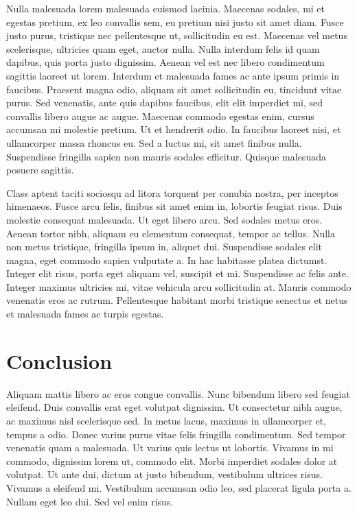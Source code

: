 \documentclass[12pt]{article}
\begin{document}
    Nulla malesuada lorem malesuada euismod lacinia. Maecenas sodales, mi et egestas pretium, ex leo convallis sem, eu pretium nisi justo sit amet diam. Fusce justo purus, tristique nec pellentesque ut, sollicitudin eu est. Maecenas vel metus scelerisque, ultricies quam eget, auctor nulla. Nulla interdum felis id quam dapibus, quis porta justo dignissim. Aenean vel est nec libero condimentum sagittis laoreet ut lorem. Interdum et malesuada fames ac ante ipsum primis in faucibus. Praesent magna odio, aliquam sit amet sollicitudin eu, tincidunt vitae purus. Sed venenatis, ante quis dapibus faucibus, elit elit imperdiet mi, sed convallis libero augue ac augue. Maecenas commodo egestas enim, cursus accumsan mi molestie pretium. Ut et hendrerit odio. In faucibus laoreet nisi, et ullamcorper massa rhoncus eu. Sed a luctus mi, sit amet finibus nulla. Suspendisse fringilla sapien non mauris sodales efficitur. Quisque malesuada posuere sagittis.
    
    Class aptent taciti sociosqu ad litora torquent per conubia nostra, per inceptos himenaeos. Fusce arcu felis, finibus sit amet enim in, lobortis feugiat risus. Duis molestie consequat malesuada. Ut eget libero arcu. Sed sodales metus eros. Aenean tortor nibh, aliquam eu elementum consequat, tempor ac tellus. Nulla non metus tristique, fringilla ipsum in, aliquet dui. Suspendisse sodales elit magna, eget commodo sapien vulputate a. In hac habitasse platea dictumst. Integer elit risus, porta eget aliquam vel, suscipit et mi. Suspendisse ac felis ante. Integer maximus ultricies mi, vitae vehicula arcu sollicitudin at. Mauris commodo venenatis eros ac rutrum. Pellentesque habitant morbi tristique senectus et netus et malesuada fames ac turpis egestas.


\section{Conclusion}

    Aliquam mattis libero ac eros congue convallis. Nunc bibendum libero sed feugiat eleifend. Duis convallis erat eget volutpat dignissim. Ut consectetur nibh augue, ac maximus nisl scelerisque sed. In metus lacus, maximus in ullamcorper et, tempus a odio. Donec varius purus vitae felis fringilla condimentum. Sed tempor venenatis quam a malesuada. Ut varius quis lectus ut lobortis. Vivamus in mi commodo, dignissim lorem ut, commodo elit. Morbi imperdiet sodales dolor at volutpat. Ut ante dui, dictum at justo bibendum, vestibulum ultrices risus. Vivamus a eleifend mi. Vestibulum accumsan odio leo, sed placerat ligula porta a. Nullam eget leo dui. Sed vel enim risus.
\end{document}
